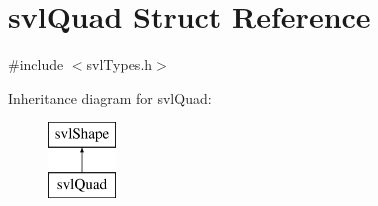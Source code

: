\hypertarget{structsvl_quad}{}\section{svl\+Quad Struct Reference}
\label{structsvl_quad}


{\ttfamily \#include $<$svl\+Types.\+h$>$}

Inheritance diagram for svl\+Quad\+:\begin{figure}[H]
\begin{center}
\leavevmode
\includegraphics[height=2.000000cm]{d8/d79/structsvl_quad}
\end{center}
\end{figure}
